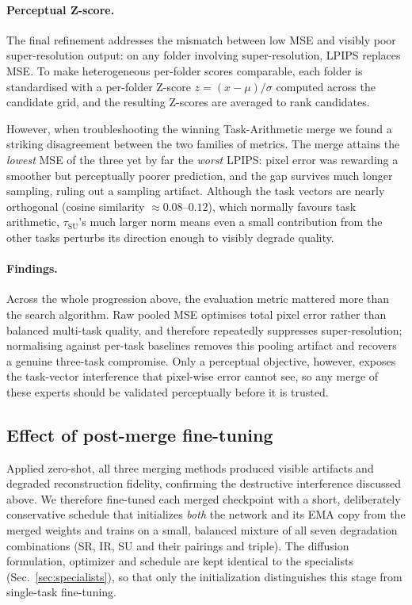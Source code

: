 \documentclass{article}
\begin{document}
\paragraph*{Perceptual Z-score.} The final refinement addresses the mismatch between low MSE and visibly poor super-resolution output: on any folder involving super-resolution, LPIPS replaces MSE. To make heterogeneous per-folder scores comparable, each folder is standardised with a per-folder Z-score $z=(x-\mu)/\sigma$ computed across the candidate grid, and the resulting Z-scores are averaged to rank candidates.

However, when troubleshooting the winning Task-Arithmetic merge we found a striking disagreement between the two families of metrics. The merge attains the \emph{lowest} MSE of the three yet by far the \emph{worst} LPIPS: pixel error was rewarding a smoother but perceptually poorer prediction, and the gap survives much longer sampling, ruling out a sampling artifact. Although the task vectors are nearly orthogonal (cosine similarity $\approx 0.08$--$0.12$), which normally favours task arithmetic, $\tau_{\mathrm{SU}}$'s much larger norm means even a small contribution from the other tasks perturbs its direction enough to visibly degrade quality.

\paragraph*{Findings.} Across the whole progression above, the evaluation metric mattered more than the search algorithm. Raw pooled MSE optimises total pixel error rather than balanced multi-task quality, and therefore repeatedly suppresses super-resolution; normalising against per-task baselines removes this pooling artifact and recovers a genuine three-task compromise. Only a perceptual objective, however, exposes the task-vector interference that pixel-wise error cannot see, so any merge of these experts should be validated perceptually before it is trusted.

\subsection{Effect of post-merge fine-tuning}
\label{sec:ft-results}

Applied zero-shot, all three merging methods produced visible artifacts and degraded reconstruction fidelity, confirming the destructive interference discussed above. We therefore fine-tuned each merged checkpoint with a short, deliberately conservative schedule that initializes \emph{both} the network and its EMA copy from the merged weights and trains on a small, balanced mixture of all seven degradation combinations (SR, IR, SU and their pairings and triple). The diffusion formulation, optimizer and schedule are kept identical to the specialists (Sec.~\ref{sec:specialists}), so that only the initialization distinguishes this stage from single-task fine-tuning.
\end{document}
